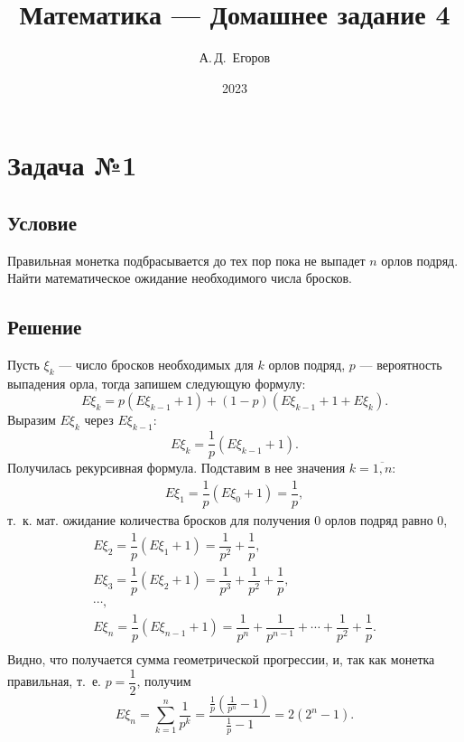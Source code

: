 \documentclass[12pt, a4paper]{article}
\title{Математика --- Домашнее задание 4}
\author{А.\,Д.~Егоров}
\date{2023}
\begin{document}
	
	\maketitle
	\tableofcontents
	\pagebreak
	
	\section{Задача №1}
	
		\subsection*{Условие}		
			Правильная монетка подбрасывается до тех пор пока не выпадет $n$ орлов подряд. Найти математическое ожидание необходимого числа бросков.
		\subsection*{Решение}
		
			Пусть $\xi_k$ --- число бросков необходимых для $k$ орлов подряд, $p$ --- вероятность выпадения орла, тогда запишем следующую формулу:
			\begin{equation}
				\label{Exi_k}
				E\xi_k = p (E\xi_{k-1} + 1) + \left(1 - p\right) 
				\left( E\xi_{k-1} + 1 + E\xi_k\right).
			\end{equation}
			Выразим $E\xi_k$ через $E\xi_{k-1}$:
			$$
				E\xi_k = \dfrac{1}{p}(E\xi_{k-1} + 1).
			$$
			Получилась рекурсивная формула. Подставим в нее значения $k = \overline{1, n}$:
			\begin{gather*}
				E\xi_1 = \dfrac{1}{p}(E\xi_{0} + 1) = \dfrac{1}{p},
			\end{gather*}
			т.~к. мат. ожидание количества бросков для получения 0 орлов подряд равно 0,
			\begin{gather*}
				E\xi_2 = \dfrac{1}{p}(E\xi_{1} + 1) = \dfrac{1}{p^2} + \dfrac{1}{p}, \\
				E\xi_3 = \dfrac{1}{p}(E\xi_{2} + 1) = \dfrac{1}{p^3} + \dfrac{1}{p^2} + \dfrac{1}{p}, \\
				\cdots, \\
				E\xi_n = \dfrac{1}{p}(E\xi_{n-1} + 1) = \dfrac{1}{p^n} + \dfrac{1}{p^{n-1}} + \cdots + \dfrac{1}{p^2} + \dfrac{1}{p}. \\
			\end{gather*}
			Видно, что получается сумма геометрической прогрессии, и, так как монетка правильная, т.~е. $p = \dfrac{1}{2}$, получим 
			$$
				E\xi_n = \sum_{k=1}^{n} \dfrac{1}{p^k} = \dfrac{\frac{1}{p} (\frac{1}{p^n} -1)}{\frac{1}{p} - 1} = 2 (2^n - 1).
			$$
			 
\end{document}
